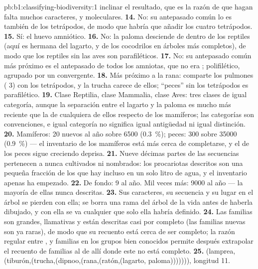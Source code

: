 \begin{solution}{pb:b1:classifying-biodiversity:1}
inclinar el resultado, que es la razón de que hagan falta muchos caracteres,
y moleculares.
\textbf{14.} No: su antepasado común lo es también de los tetrápodos, de
modo que habría que añadir los cuatro tetrápodos.
\textbf{15.} Sí: el huevo amniótico.
\textbf{16.} No: la paloma desciende de dentro de los reptiles (aquí es
hermana del lagarto, y de los cocodrilos en árboles más completos), de modo
que los reptiles sin las aves son parafiléticos.
\textbf{17.} No: su antepasado común más próximo es el antepasado de todos
los amniotas, que no era ; polifilético, agrupado por un 
convergente.
\textbf{18.} Más próximo a la rana: comparte los pulmones ( 3) con
los tetrápodos, y la trucha carece de ellos; ``peces'' sin los tetrápodos es
parafilético.
\textbf{19.} Clase Reptilia, clase Mammalia, clase Aves: tres clases de
igual categoría, aunque la separación entre el lagarto y la paloma es mucho
más reciente que la de cualquiera de ellos respecto de los mamíferos; las
categorías son convenciones, e igual categoría no significa igual antigüedad
ni igual distinción.
\textbf{20.} Mamíferos: \num{20} nuevos al año sobre \num{6500}
(\qty{0.3}{\%}); peces: \num{300} sobre \num{35000} (\qty{0.9}{\%}) --- el
inventario de los mamíferos está más cerca de completarse, y el de los peces
sigue creciendo deprisa.
\textbf{21.} Nueve décimas partes de las secuencias pertenecen a 
nunca cultivados ni nombrados: los procariotas descritos son una pequeña
fracción de los que hay incluso en un solo litro de agua, y el inventario
apenas ha empezado.
\textbf{22.} De fondo: \num{9} al año. Mil veces más: \num{9000} al año ---
la mayoría de ellas  nunca descritas.
\textbf{23.} Sus caracteres, su secuencia y su lugar en el árbol se pierden
con ella; se borra una rama del árbol de la vida antes de haberla dibujado,
y con ella se va cualquier  que solo ella habría definido.
\textbf{24.} Las familias son grandes, llamativas y están descritas casi por
completo (las familias nuevas son ya raras), de modo que su recuento está
cerca de ser completo; la razón regular entre ,  y familias
en los grupos bien conocidos permite después extrapolar el recuento de
familias al de  allí donde este no está completo.
\textbf{25.} (lamprea,(tiburón,(trucha,(dipnoo,(rana,(ratón,(lagarto,
paloma))))))), longitud \num{11}.
\end{solution}

